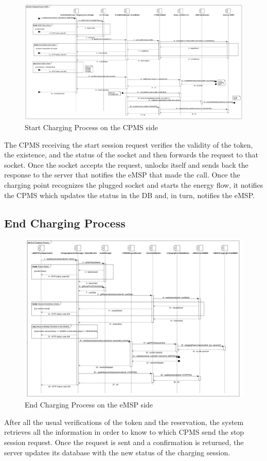 \documentclass{Configuration_Files/PoliMi3i_thesis}
\begin{document}
\begin{figure}[H]
    \centering
    \includegraphics[width=1\textwidth]{Images/sequenceDiagrams/Start Charging Process CPMS.jpg}
    \caption{Start Charging Process on the CPMS side}
\end{figure}
The CPMS receiving the start session request verifies the validity of the token, the existence, and the status of the socket and then forwards the request to that socket.
Once the socket accepts the request, unlocks itself and sends back the response to the server that notifies the eMSP that made the call. Once the charging point recognizes the plugged socket and starts the energy flow, it notifies the CPMS which updates the status in the DB and, in turn, notifies the eMSP.

\subsection{End Charging Process}
\begin{figure}[H]
    \centering
    \includegraphics[width=1\textwidth]{Images/sequenceDiagrams/End Charging Process.jpg}
    \caption{End Charging Process on the eMSP side}
\end{figure}
After all the usual verifications of the token and the reservation, the system retrieves all the information in order to know to which CPMS send the stop session request. Once the request is sent and a confirmation is returned, the server updates its database with the new status of the charging session.
\end{document}
